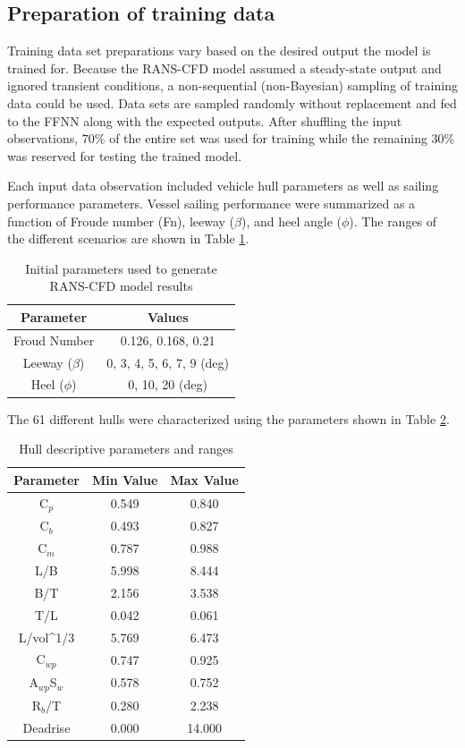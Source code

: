 \documentclass[10pt,a4paper,twocolumn]{article}
\begin{document}
\subsection{Preparation of training data}

Training data set preparations vary based on the desired output the model is trained for. Because the RANS-CFD model assumed a steady-state output and ignored transient conditions, a non-sequential (non-Bayesian) sampling of training data could be used. Data sets are sampled randomly without replacement and fed to the FFNN along with the expected outputs. After shuffling the input observations, 70\% of the entire set was used for training while the remaining 30\% was reserved for testing the trained model.

Each input data observation included vehicle hull parameters as well as sailing performance parameters. Vessel sailing performance were summarized as a function of Froude number (Fn), leeway ($\beta$), and heel angle ($\phi$). The ranges of the different scenarios are shown in Table \ref{tab:parameters}.

\begin{table}[]
\centering
\caption{Initial parameters used to generate RANS-CFD model results}
\label{tab:parameters}
\begin{tabular}{@{}cc@{}}
\toprule
\textbf{Parameter} & \textbf{Values} \\ \midrule
Froud Number & 0.126, 0.168, 0.21 \\
Leeway ($\beta$) & 0, 3, 4, 5, 6, 7, 9 (deg) \\
Heel ($\phi$) & 0, 10, 20 (deg) \\ \bottomrule
\end{tabular}
\end{table}

The 61 different hulls were characterized using the parameters shown in Table \ref{tab:hull_parameters}.

\begin{table}[]
\centering
\caption{Hull descriptive parameters and ranges}
\label{tab:hull_parameters}
\begin{tabular}{@{}ccc@{}}
\toprule
\textbf{Parameter} & \textbf{Min Value} & \textbf{Max Value} \\ \midrule
C$_{p}$ & 0.549 & 0.840 \\
C$_{b}$ & 0.493 & 0.827 \\
C$_{m}$ & 0.787 & 0.988 \\
L/B & 5.998 & 8.444 \\
B/T & 2.156 & 3.538 \\
T/L & 0.042 & 0.061 \\
L/vol\textasciicircum{}1/3 & 5.769 & 6.473 \\
C$_{wp}$ & 0.747 & 0.925 \\
A$_{wp}$S$_{w}$ & 0.578 & 0.752 \\
R$_{b}$/T & 0.280 & 2.238 \\
Deadrise & 0.000 & 14.000 \\ \bottomrule
\end{tabular}
\end{table}
\end{document}
